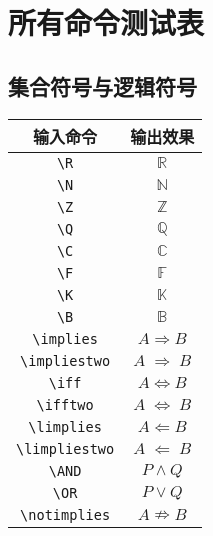 \documentclass[12pt,a4paper]{ctexart}
\providecommand{\R}{\ensuremath{\mathbb{R}}} %
\providecommand{\N}{\ensuremath{\mathbb{N}}} %
\providecommand{\Z}{\ensuremath{\mathbb{Z}}} %
\providecommand{\Q}{\ensuremath{\mathbb{Q}}} %
\providecommand{\C}{\ensuremath{\mathbb{C}}} %
\providecommand{\F}{\ensuremath{\mathbb{F}}} %
\providecommand{\K}{\ensuremath{\mathbb{K}}} %
\providecommand{\B}{\ensuremath{\mathbb{B}}}
\providecommand{\implies}{\ensuremath{\Rightarrow}}       %
\providecommand{\iff}{\ensuremath{\Leftrightarrow}}      %
\providecommand{\limplies}{\ensuremath{\Leftarrow}}      %
\providecommand{\impliestwo}{\ensuremath{\;\Rightarrow\;}}
\providecommand{\ifftwo}{\ensuremath{\;\Leftrightarrow\;}}
\providecommand{\limpliestwo}{\ensuremath{\;\Leftarrow\;}}
\providecommand{\AND}{\wedge} %
\providecommand{\OR}{\vee} %
\providecommand{\notimplies}{\nRightarrow} %
\begin{document}
\section{所有命令测试表}

\subsection*{集合符号与逻辑符号}
\begin{center}
	\begin{tabular}{|c|c|}
		\hline
		输入命令 & 输出效果 \\
		\hline
		\verb|\R| & $\R$ \\
		\verb|\N| & $\N$ \\
		\verb|\Z| & $\Z$ \\
		\verb|\Q| & $\Q$ \\
		\verb|\C| & $\C$ \\
		\verb|\F| & $\F$ \\
		\verb|\K| & $\K$ \\
		\verb|\B| & $\B$ \\
		\verb|\implies| & $A \implies B$ \\
		\verb|\impliestwo| & $A \impliestwo B$ \\
		\verb|\iff| & $A \iff B$ \\
		\verb|\ifftwo| & $A \ifftwo B$ \\
		\verb|\limplies| & $A \limplies B$ \\
		\verb|\limpliestwo| & $A \limpliestwo B$ \\
		\verb|\AND| & $P \AND Q$ \\
		\verb|\OR| & $P \OR Q$ \\
		\verb|\notimplies| & $A \notimplies B$ \\
		\hline
	\end{tabular}
\end{center}
\end{document}
